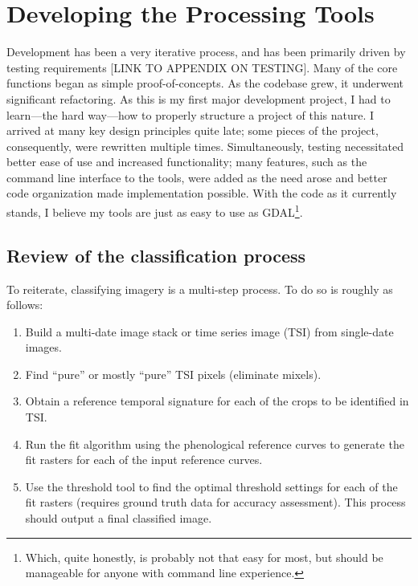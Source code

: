 \chapter{Developing the Processing Tools}
\label{appendix:tools}

Development has been a very iterative process, and has been primarily driven by testing requirements [LINK TO APPENDIX ON TESTING]. Many of the core functions began as simple proof-of-concepts. As the codebase grew, it underwent significant refactoring. As this is my first major development project, I had to learn—the hard way—how to properly structure a project of this nature. I arrived at many key design principles quite late; some pieces of the project, consequently, were rewritten multiple times. Simultaneously, testing necessitated better ease of use and increased functionality; many features, such as the command line interface to the tools, were added as the need arose and better code organization made implementation possible. With the code as it currently stands, I believe my tools are just as easy to use as GDAL\footnote{Which, quite honestly, is probably not that easy for most, but should be manageable for anyone with command line experience.}.

\section{Review of the classification process}

To reiterate, classifying imagery is a multi-step process. To do so is roughly as follows:

\begin{enumerate}
  \item Build a multi-date image stack or time series image (TSI) from single-date images.
  \item Find “pure” or mostly “pure” TSI pixels (eliminate mixels).
  \item Obtain a reference temporal signature for each of the crops to be identified in TSI.
  \item Run the fit algorithm using the phenological reference curves to generate the fit rasters for each of the input reference curves.
  \item Use the threshold tool to find the optimal threshold settings for each of the fit rasters (requires ground truth data for accuracy assessment). This process should output a final classified image.
\end{enumerate}

